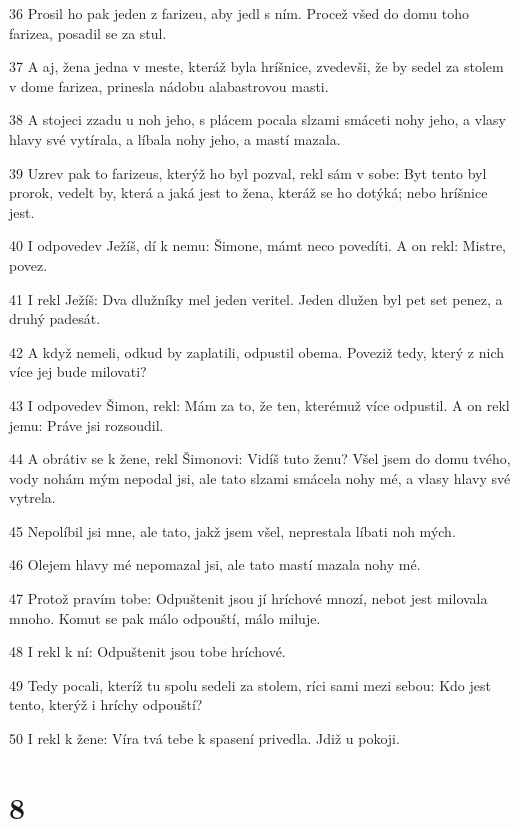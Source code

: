 \par 36 Prosil ho pak jeden z farizeu, aby jedl s ním. Procež všed do domu toho farizea, posadil se za stul.
\par 37 A aj, žena jedna v meste, kteráž byla hríšnice, zvedevši, že by sedel za stolem v dome farizea, prinesla nádobu alabastrovou masti.
\par 38 A stojeci zzadu u noh jeho, s plácem pocala slzami smáceti nohy jeho, a vlasy hlavy své vytírala, a líbala nohy jeho, a mastí mazala.
\par 39 Uzrev pak to farizeus, kterýž ho byl pozval, rekl sám v sobe: Byt tento byl prorok, vedelt by, která a jaká jest to žena, kteráž se ho dotýká; nebo hríšnice jest.
\par 40 I odpovedev Ježíš, dí k nemu: Šimone, mámt neco povedíti. A on rekl: Mistre, povez.
\par 41 I rekl Ježíš: Dva dlužníky mel jeden veritel. Jeden dlužen byl pet set penez, a druhý padesát.
\par 42 A když nemeli, odkud by zaplatili, odpustil obema. Poveziž tedy, který z nich více jej bude milovati?
\par 43 I odpovedev Šimon, rekl: Mám za to, že ten, kterémuž více odpustil. A on rekl jemu: Práve jsi rozsoudil.
\par 44 A obrátiv se k žene, rekl Šimonovi: Vidíš tuto ženu? Všel jsem do domu tvého, vody nohám mým nepodal jsi, ale tato slzami smácela nohy mé, a vlasy hlavy své vytrela.
\par 45 Nepolíbil jsi mne, ale tato, jakž jsem všel, neprestala líbati noh mých.
\par 46 Olejem hlavy mé nepomazal jsi, ale tato mastí mazala nohy mé.
\par 47 Protož pravím tobe: Odpuštenit jsou jí hríchové mnozí, nebot jest milovala mnoho. Komut se pak málo odpouští, málo miluje.
\par 48 I rekl k ní: Odpuštenit jsou tobe hríchové.
\par 49 Tedy pocali, kteríž tu spolu sedeli za stolem, ríci sami mezi sebou: Kdo jest tento, kterýž i hríchy odpouští?
\par 50 I rekl k žene: Víra tvá tebe k spasení privedla. Jdiž u pokoji.

\chapter{8}

